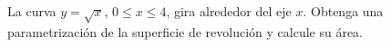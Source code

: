 La curva $y=\sqrt{x}$, $0\leq x\leq4$, gira alrededor del eje $x$. Obtenga una parametrización de la superficie de revolución y calcule su área.
